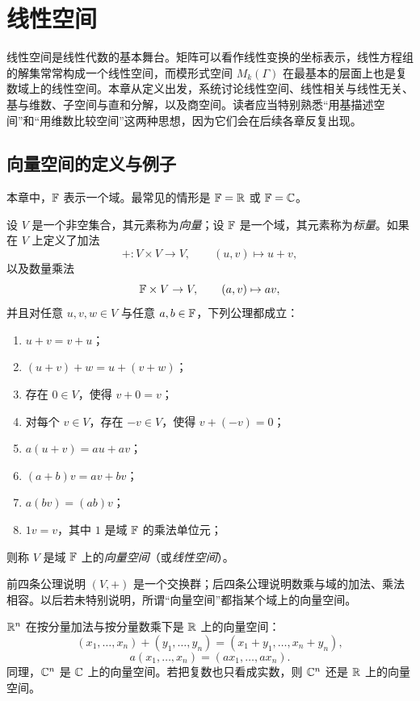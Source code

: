 \chapter{线性空间}

线性空间是线性代数的基本舞台。矩阵可以看作线性变换的坐标表示，线性方程组的解集常常构成一个线性空间，而模形式空间 $M_k(\Gamma)$ 在最基本的层面上也是复数域上的线性空间。本章从定义出发，系统讨论线性空间、线性相关与线性无关、基与维数、子空间与直和分解，以及商空间。读者应当特别熟悉“用基描述空间”和“用维数比较空间”这两种思想，因为它们会在后续各章反复出现。

\section{向量空间的定义与例子}

本章中，$\mathbb{F}$ 表示一个域。最常见的情形是 $\mathbb{F}=\mathbb{R}$ 或 $\mathbb{F}=\mathbb{C}$。

\begin{definition}
设 $V$ 是一个非空集合，其元素称为\emph{向量}；设 $\mathbb{F}$ 是一个域，其元素称为\emph{标量}。如果在 $V$ 上定义了加法
\[
+:V\times V\to V,\qquad (u,v)\mapsto u+v,
\]
以及数量乘法
\[
\mathbb{F}\times V\to V,\qquad (a,v)\mapsto av,
\]
并且对任意 $u,v,w\in V$ 与任意 $a,b\in\mathbb{F}$，下列公理都成立：
\begin{enumerate}[label=\textnormal{(\arabic*)}]
  \item $u+v=v+u$；
  \item $(u+v)+w=u+(v+w)$；
  \item 存在 $0\in V$，使得 $v+0=v$；
  \item 对每个 $v\in V$，存在 $-v\in V$，使得 $v+(-v)=0$；
  \item $a(u+v)=au+av$；
  \item $(a+b)v=av+bv$；
  \item $a(bv)=(ab)v$；
  \item $1v=v$，其中 $1$ 是域 $\mathbb{F}$ 的乘法单位元；
\end{enumerate}
则称 $V$ 是域 $\mathbb{F}$ 上的\emph{向量空间}（或\emph{线性空间}）。
\end{definition}

\begin{remark}
前四条公理说明 $(V,+)$ 是一个交换群；后四条公理说明数乘与域的加法、乘法相容。以后若未特别说明，所谓“向量空间”都指某个域上的向量空间。
\end{remark}

\begin{example}[欧氏空间]
$\mathbb{R}^n$ 在按分量加法与按分量数乘下是 $\mathbb{R}$ 上的向量空间：
\[
(x_1,\dots,x_n)+(y_1,\dots,y_n)=(x_1+y_1,\dots,x_n+y_n),
\]
\[
a(x_1,\dots,x_n)=(ax_1,\dots,ax_n).
\]
同理，$\mathbb{C}^n$ 是 $\mathbb{C}$ 上的向量空间。若把复数也只看成实数，则 $\mathbb{C}^n$ 还是 $\mathbb{R}$ 上的向量空间。
\end{example}

